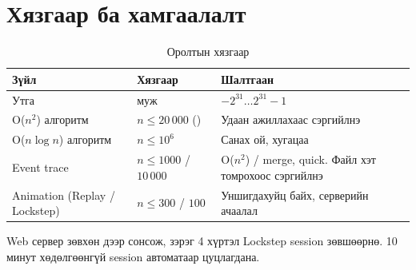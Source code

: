\section{Хязгаар ба хамгаалалт}\label{sec:limits}
\begin{table}[H]
\centering\small
\caption{Оролтын хязгаар}\label{tab:limits}
\begin{tabularx}{\linewidth}{@{}YlY@{}}
\toprule
Зүйл & Хязгаар & Шалтгаан \\
\midrule
Утга &  муж & $-2^{31} \dots 2^{31}-1$ \\
O($n^2$) алгоритм & $n \le 20\,000$ () & Удаан ажиллахаас сэргийлнэ \\
O($n\log n$) алгоритм & $n \le 10^6$ & Санах ой, хугацаа \\
Event trace & $n \le 1000$ / $10\,000$ & O($n^2$) / merge, quick. Файл хэт томрохоос сэргийлнэ \\
Animation (Replay / Lockstep) & $n \le 300$ / $100$ & Уншигдахуйц байх, серверийн ачаалал \\
\bottomrule
\end{tabularx}
\end{table}
Web сервер зөвхөн  дээр сонсож, зэрэг 4 хүртэл Lockstep session зөвшөөрнө. 10 минут
хөдөлгөөнгүй session автоматаар цуцлагдана.
